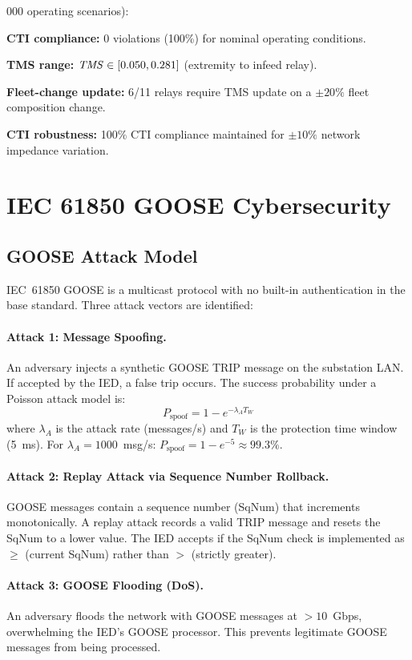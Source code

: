 000 operating scenarios):

\textbf{CTI compliance:} 0 violations (100\%) for nominal operating conditions.

\textbf{TMS range:} $\mathit{TMS} \in [0.050, 0.281]$ (extremity to infeed relay).

\textbf{Fleet-change update:} 6/11 relays require TMS update on a
$\pm 20\%$ fleet composition change.

\textbf{CTI robustness:} 100\% CTI compliance maintained for $\pm 10\%$
network impedance variation.


\section{IEC 61850 GOOSE Cybersecurity}
\label{sec:ch11_security}

\subsection{GOOSE Attack Model}

IEC~61850 GOOSE is a multicast protocol with no built-in authentication
in the base standard. Three attack vectors are identified:

\paragraph{Attack 1: Message Spoofing.}
An adversary injects a synthetic GOOSE TRIP message on the substation LAN.
If accepted by the IED, a false trip occurs. The success probability
under a Poisson attack model is:
\begin{equation}
  P_\mathrm{spoof} = 1 - e^{-\lambda_A T_W}
  \label{eq:ch9_spoof_prob}
\end{equation}
where $\lambda_A$ is the attack rate (messages/s) and $T_W$ is the
protection time window (5~ms). For $\lambda_A = 1000$~msg/s:
$P_\mathrm{spoof} = 1 - e^{-5} \approx 99.3\%$.

\paragraph{Attack 2: Replay Attack via Sequence Number Rollback.}
GOOSE messages contain a sequence number (SqNum) that increments
monotonically. A replay attack records a valid TRIP message and resets
the SqNum to a lower value. The IED accepts if the SqNum check is
implemented as $\geq$ (current SqNum) rather than $>$ (strictly greater).

\paragraph{Attack 3: GOOSE Flooding (DoS).}
An adversary floods the network with GOOSE messages at $> 10$~Gbps,
overwhelming the IED's GOOSE processor. This prevents legitimate
GOOSE messages from being processed.

